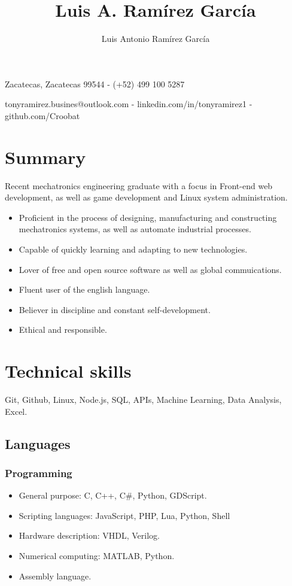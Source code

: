 \documentclass{article}
\author{Luis Antonio Ramírez García}
\title{Luis A. Ramírez García}
\makeatletter
\renewcommand{\maketitle}{
  \begin{center}
    {
      \huge\bfseries
      \theauthor
    }

    \vspace{1em}

    Zacatecas, Zacatecas 99544 - (+52) 499 100 5287

    \vspace{0.5em}

    tonyramirez.busines@outlook.com - linkedin.com/in/tonyramirez1 - github.com/Croobat

  \end{center}
}
\makeatother
\begin{document}

  \maketitle

  \section{Summary}

  Recent mechatronics engineering graduate with a focus in Front-end web development, as well as game development and Linux system administration.

  \begin{itemize}
    \item Proficient in the process of designing, manufacturing and constructing mechatronics systems, as well as automate industrial processes.

    \item Capable of quickly learning and adapting to new technologies.

    \item Lover of free and open source software as well as global commuications.

    \item Fluent user of the english language.

    \item Believer in discipline and constant self-development.

    \item Ethical and responsible.
  \end{itemize}


  \section{Technical skills}

  Git, Github, Linux, Node.js, SQL, APIs, Machine Learning, Data Analysis, Excel.

    \subsection{Languages}

    \subsubsection{Programming}

    \begin{itemize}
      \item General purpose: C, C++, C\#, Python, GDScript.
      \item Scripting languages: JavaScript, PHP, Lua, Python, Shell
      \item Hardware description: VHDL, Verilog.
      \item Numerical computing: MATLAB, Python.
      \item Assembly language.
    \end{itemize}
\end{document}

